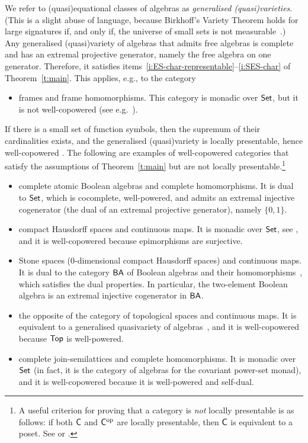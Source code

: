 \documentclass[a4paper,10pt,reqno]{amsart}
\theoremstyle{definition}
\theoremstyle{remark}
\newcommand{\cat}{{\sf C}}								%
\newcommand{\Set}{{\sf Set}}							%
\newcommand{\Top}{{\sf Top}}							%
\newcommand{\Frm}{{\sf Frm}}							%
\newcommand{\CABA}{{\sf CABA}}							%
\newcommand{\CH}{{\sf CH}}							    %
\newcommand{\Stone}{{\sf Stone}}					    %
\newcommand{\CSLat}{{\sf CSLat}}						%
\newcommand{\BA}{{\sf BA}}								%
\newcommand{\op}{{\mathrm{op}}}						%
\begin{document}
We refer to (quasi)equational classes of algebras as \emph{generalised (quasi)varieties}. (This is a slight abuse of language, because Birkhoff's Variety Theorem holds for large signatures if, and only if, the universe of small sets is not measurable~\cite{AT2005}.)
%
Any generalised (quasi)variety of algebras that admits free algebras is complete and has an extremal projective generator, namely the free algebra on one generator.
Therefore, it satisfies items~\ref{i:ES-char-representable}--\ref{i:SES-char} of Theorem~\ref{t:main}. This applies, e.g., to the category

\begin{itemize}
	\item[$\Frm$:] frames and frame homomorphisms.  This category is monadic over $\Set$, but it is not well-copowered (see e.g.\ \cite[\S IV.6.6]{PP2012}).
\end{itemize}

If there is a small set of function symbols, then the supremum of their cardinalities exists, and the generalised (quasi)variety is locally presentable, hence well-copowered \cite[Theorem~1.58]{ar94book}. The following are examples of well-copowered categories that satisfy the assumptions of Theorem~\ref{t:main} but are not locally presentable.\footnote{A useful criterion for proving that a category is \emph{not} locally presentable is as follows: if both $\cat$ and $\cat^{\op}$ are locally presentable, then $\cat$ is equivalent to a poset. See \cite[Satz~7.13]{GabrielUlmer1971} or \cite[Theorem~1.64]{ar94book}.}

\begin{itemize}
\item[$\CABA$:] complete atomic Boolean algebras and complete homomorphisms. It is dual to $\Set$, which is cocomplete, well-powered, and admits an extremal injective cogenerator (the dual of an extremal projective generator), namely $\{0,1\}$.
\item[$\CH$:] compact Hausdorff spaces and continuous maps. It is monadic over $\Set$, see \cite{Manes1976}, and it is well-copowered because epimorphisms are surjective.
\item[$\Stone$:] Stone spaces ($0$-dimensional compact Hausdorff spaces) and continuous maps. It is dual to the category $\BA$ of Boolean algebras and their homomorphisms~\cite{Stone1936}, which satisfies the dual properties. In particular, the two-element Boolean algebra is an extremal injective cogenerator in $\BA$.
\item[$\Top^\op$:] the opposite of the category of topological spaces and continuous maps. It is equivalent to a generalised quasivariety of algebras~\cite{BP1995}, and it is well-copowered because $\Top$ is well-powered.
\item[$\CSLat$:] complete join-semilattices and complete homomorphisms. It is monadic over $\Set$ (in fact, it is the category of algebras for the covariant power-set monad), and it is well-copowered because it is well-powered and self-dual.
\end{itemize}
\end{document}
